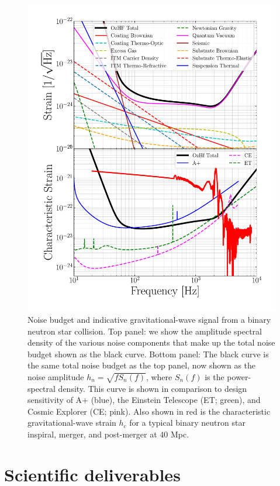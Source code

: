 \documentclass[prx,superscriptaddress,twocolumn,nopreprintnumbers,floatfix,nofootinbib]{revtex4}
\begin{document}
\begin{figure}[htb]
\centering
\includegraphics[width=1.0\columnwidth]{noise_budget_hc.pdf}
\caption{Noise budget and indicative gravitational-wave signal from a binary neutron star collision.  Top panel: we show the amplitude spectral density of the various noise components that make up the total noise budget shown as the black curve.  Bottom panel: The black curve is the same total noise budget as the top panel, now shown as the noise amplitude $h_n=\sqrt{fS_n(f)}$, where $S_n(f)$ is the power-spectral density. This curve is shown in comparison to design sensitivity of A+ (blue), the Einstein Telescope (ET; green), and Cosmic Explorer (CE; pink).  Also shown in red is the characteristic gravitational-wave strain $h_c$ for a typical binary neutron star inspiral, merger, and post-merger at 40 Mpc.}
\label{fig:noisecurve}
\end{figure}


\section{Scientific deliverables}\label{sec:science}
\end{document}

